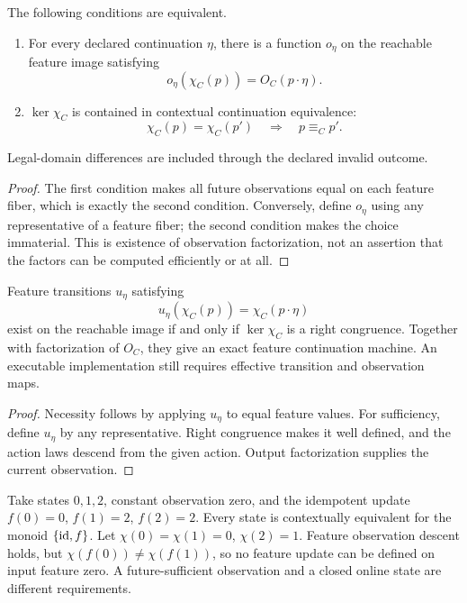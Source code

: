 \begin{theorem}
\label{thm:feature-observation-descent}
The following conditions are equivalent.
\begin{enumerate}
  \item For every declared continuation $\eta$, there is a function $o_\eta$
  on the reachable feature image satisfying
  \[
    o_\eta(\chi_C(p))=O_C(p\cdot\eta).
  \]
  \item $\ker\chi_C$ is contained in contextual continuation equivalence:
  \[
    \chi_C(p)=\chi_C(p')\quad\Longrightarrow\quad p\equiv_Cp'.
  \]
\end{enumerate}
Legal-domain differences are included through the declared invalid outcome.
\end{theorem}
\begin{proof}
The first condition makes all future observations equal on each feature fiber,
which is exactly the second condition.  Conversely, define $o_\eta$ using any
representative of a feature fiber; the second condition makes the choice
immaterial.  This is existence of observation factorization, not an assertion
that the factors can be computed efficiently or at all.
\end{proof}

\begin{proposition}
\label{prop:feature-online-update}
Feature transitions $u_\eta$ satisfying
\[
  u_\eta(\chi_C(p))=\chi_C(p\cdot\eta)
\]
exist on the reachable image if and only if $\ker\chi_C$ is a right
congruence.  Together with factorization of $O_C$, they give an exact feature
continuation machine.  An executable implementation still requires effective
transition and observation maps.
\end{proposition}
\begin{proof}
Necessity follows by applying $u_\eta$ to equal feature values.  For sufficiency,
define $u_\eta$ by any representative.  Right congruence makes it well defined,
and the action laws descend from the given action.  Output factorization
supplies the current observation.
\end{proof}

\begin{example}
\label{ex:feature-not-online}
Take states $0,1,2$, constant observation zero, and the idempotent update
$f(0)=0$, $f(1)=2$, $f(2)=2$.  Every state is contextually equivalent for the
monoid $\{\operatorname{id},f\}$.  Let $\chi(0)=\chi(1)=0$, $\chi(2)=1$.
Feature observation descent holds, but $\chi(f(0))\ne\chi(f(1))$, so no
feature update can be defined on input feature zero.  A future-sufficient
observation and a closed online state are different requirements.
\end{example}

